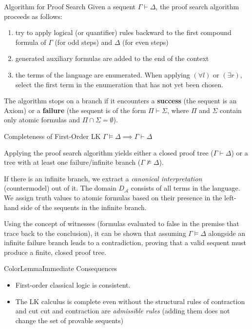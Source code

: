 \documentclass[a4paper, 11pt]{report}
\begin{document}
\begin{gframe}{Algorithm for Proof Search}
Given a sequent $\Gamma \vdash \Delta$, the proof search algorithm proceeds as follows:
\begin{enumerate}
    \item try to apply logical (or quantifier) rules backward to the first compound formula of $\Gamma$ (for odd steps) and $\Delta$ (for even steps)
    \item generated auxiliary formulas are added to the end of the context
    \item the terms of the language are enumerated. When applying $(\forall l)$ or $(\exists r)$, select the first term in the enumeration that has not yet been chosen.
\end{enumerate}
The algorithm stops on a branch if it encounters a \textbf{success} (the sequent is an Axiom) or a \textbf{failure} (the sequent is of the form $\Pi \vdash \Sigma$, where $\Pi$ and $\Sigma$ contain only atomic formulas and $\Pi \cap \Sigma = \emptyset$).
\end{gframe}

\begin{thmframe}{Completeness of First-Order LK}{}
    $\Gamma \models \Delta \implies \Gamma \vdash \Delta$
\end{thmframe}
\begin{proofframe}{}{}
    \vspace{-1em}
Applying the proof search algorithm yields either a closed proof tree ($\Gamma \vdash \Delta$) or a tree with at least one failure/infinite branch ($\Gamma \not\models \Delta$). 
    
If there is an infinite branch, we extract a \textit{canonical interpretation} (countermodel) out of it. The domain $D_{\mathcal{A}}$ consists of all terms in the language. We assign truth values to atomic formulas based on their presence in the left-hand side of the sequents in the infinite branch. 

Using the concept of witnesses (formulas evaluated to false in the premise that trace back to the conclusion), it can be shown that assuming $\Gamma \models \Delta$ alongside an infinite failure branch leads to a contradiction, proving that a valid sequent must produce a finite, closed proof tree.
\end{proofframe}

\begin{cframe}{ColorLemma}{Immediate Consequences}
\begin{itemize}
    \item First-order classical logic is consistent.
    \item The LK calculus is complete even without the structural rules of contraction and cut
    \subitem cut and contraction are \textit{admissible rules} (adding them does not change the set of provable sequents)
\end{itemize}
\end{cframe}
\end{document}
